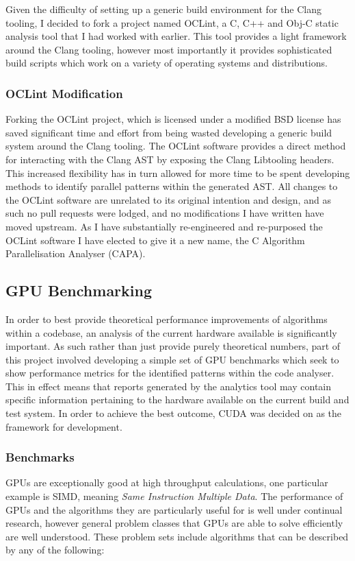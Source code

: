 Given the difficulty of setting up a generic build environment for the Clang tooling, I decided to
fork a project named OCLint\cite{oclint}, a C, C++ and Obj-C static analysis tool that I had worked
with earlier.  This tool provides a light framework around the Clang tooling, however most
importantly it provides sophisticated build scripts which work on a variety of operating systems and
distributions.

\subsubsection{OCLint Modification} 
Forking the OCLint project, which is licensed under a modified BSD license has saved significant
time and effort from being wasted developing a generic build system around the Clang tooling. The
OCLint software provides a direct method for interacting with the Clang AST by exposing the Clang
Libtooling headers. This increased flexibility has in turn allowed for more time to be spent
developing methods to identify parallel patterns within the generated AST. All changes to the OCLint
software are unrelated to its original intention and design, and as such no pull requests were
lodged, and no modifications I have written have moved upstream. As I have substantially
re-engineered and re-purposed the OCLint software I have elected to give it a new name, the C
Algorithm Parallelisation Analyser (CAPA).

\subsection{GPU Benchmarking}
In order to best provide theoretical performance improvements of algorithms within a codebase, an
analysis of the current hardware available is significantly important. As such rather than just
provide purely theoretical numbers, part of this project involved developing a simple set of GPU
benchmarks which seek to show performance metrics for the identified patterns within the code
analyser. This in effect means that reports generated by the analytics tool may contain specific
information pertaining to the hardware available on the current build and test system. In order to
achieve the best outcome, CUDA was decided on as the framework for development.

\subsubsection{Benchmarks}
GPUs are exceptionally good at high throughput calculations, one particular example is SIMD, meaning
\emph{Same Instruction Multiple Data}. The performance of GPUs and the algorithms they are
particularly useful for is well under continual research, however general problem classes that GPUs
are able to solve efficiently are well understood. These problem sets include algorithms that can be
described by any of the following:

